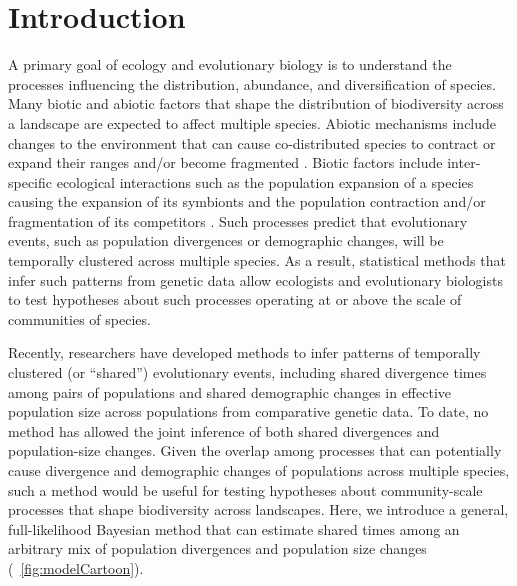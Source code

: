 \section{Introduction}

A primary goal of ecology and evolutionary biology is to understand the
processes influencing the distribution, abundance, and diversification of
species.
Many biotic and abiotic factors that shape the distribution of biodiversity
across a landscape are expected to affect multiple species.
Abiotic mechanisms include changes to the environment that can cause
co-distributed species to contract or expand their ranges and/or become
fragmented \citep{Hairston1960,Wegener1966,Avise1987,Knowles2002}.
Biotic factors include inter-specific ecological interactions such as the
population expansion of a species causing the expansion of its symbionts and
the population contraction and/or fragmentation of its competitors
\citep{Lotka1920,Volterra1926,Hairston1960,Hardin1960,Begon1996,Lunau2004}.
Such processes predict that evolutionary events, such as population divergences
or demographic changes, will be temporally clustered across multiple species.
As a result, statistical methods that infer such patterns from genetic data
allow ecologists and evolutionary biologists to test hypotheses about such
processes operating at or above the scale of communities of species.

Recently, researchers have developed methods to infer
patterns of temporally clustered (or ``shared'') evolutionary events,
including shared divergence times among pairs of populations
\citep{Hickerson2006,Hickerson2007,Huang2011,Oaks2014dpp,Oaks2018ecoevolity}
and shared demographic changes in effective population size across populations
\citep{Chan2014,Xue2015,Burbrink2016,Prates2016,Xue2017,Gehara2017}
from comparative genetic data.
To date, no method has allowed the joint inference of both shared divergences
and population-size changes.
Given the overlap among processes that can potentially cause divergence and
demographic changes of populations across multiple species, such a method would
be useful for testing hypotheses about community-scale processes that shape
biodiversity across landscapes.
Here, we introduce a general, full-likelihood Bayesian method that can estimate
shared times among an arbitrary mix of population divergences and population
size changes (\fig{}~\ref{fig:modelCartoon}).

